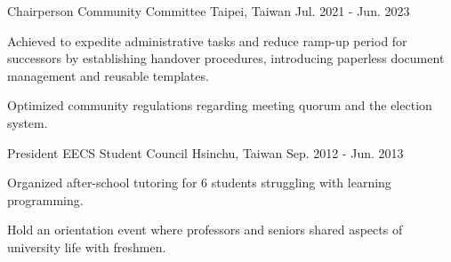 

\begin{cventries}

  \cventry
    {Chairperson} %
    {Community Committee} %
    {Taipei, Taiwan} %
    {Jul. 2021 - Jun. 2023} %
    {
      \begin{cvitems} %
        \item {Achieved to expedite administrative tasks and reduce ramp-up
          period for successors by establishing handover procedures,
          introducing paperless document management and reusable templates.}
        \item {Optimized community regulations regarding meeting quorum and the
          election system.}
      \end{cvitems}
    }

  \cventry
    {President} %
    {EECS Student Council} %
    {Hsinchu, Taiwan} %
    {Sep. 2012 - Jun. 2013} %
    {
      \begin{cvitems} %
        \item Organized after-school tutoring for 6 students struggling with learning programming.
        \item Hold an orientation event where professors and seniors shared
          aspects of university life with freshmen.
      \end{cvitems}
    }

\end{cventries}
